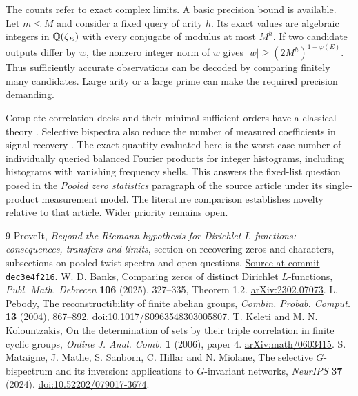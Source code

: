 \documentclass[11pt]{article}
\begin{document}
The counts refer to exact complex limits. A basic precision bound is available. Let $m\le M$ and consider a fixed query of arity $h$. Its exact values are algebraic integers in $\mathbb Q(\zeta_E)$ with every conjugate of modulus at most $M^h$. If two candidate outputs differ by $w$, the nonzero integer norm of $w$ gives $|w|\ge(2M^h)^{1-\varphi(E)}$. Thus sufficiently accurate observations can be decoded by comparing finitely many candidates. Large arity or a large prime can make the required precision demanding.

Complete correlation decks and their minimal sufficient orders have a classical theory \cite{pebody,kk}. Selective bispectra also reduce the number of measured coefficients in signal recovery \cite{selective}. The exact quantity evaluated here is the worst-case number of individually queried balanced Fourier products for integer histograms, including histograms with vanishing frequency shells. This answers the fixed-list question posed in the \emph{Pooled zero statistics} paragraph of the source article under its single-product measurement model. The literature comparison establishes novelty relative to that article. Wider priority remains open.

\begin{thebibliography}{9}\small
{} ProveIt, \emph{Beyond the Riemann hypothesis for Dirichlet $L$-functions: consequences, transfers and limits}, section on recovering zeros and characters, subsections on pooled twist spectra and open questions. \href{https://github.com/VladimirReshetnikov/ProveIt/blob/dec3e4f216305071186a1cc4c42fe1cdb38df9be/Analysis/GeneralizedRiemannHypothesis/Article/sections/rec.tex}{Source at commit \texttt{dec3e4f216}}.
 W. D. Banks, Comparing zeros of distinct Dirichlet $L$-functions, \emph{Publ. Math. Debrecen} \textbf{106} (2025), 327--335, Theorem 1.2. \href{https://arxiv.org/abs/2302.07073}{arXiv:2302.07073}.
 L. Pebody, The reconstructibility of finite abelian groups, \emph{Combin. Probab. Comput.} \textbf{13} (2004), 867--892. \href{https://doi.org/10.1017/S0963548303005807}{doi:10.1017/S0963548303005807}.
 T. Keleti and M. N. Kolountzakis, On the determination of sets by their triple correlation in finite cyclic groups, \emph{Online J. Anal. Comb.} \textbf{1} (2006), paper 4. \href{https://arxiv.org/abs/math/0603415}{arXiv:math/0603415}.
 S. Mataigne, J. Mathe, S. Sanborn, C. Hillar and N. Miolane, The selective $G$-bispectrum and its inversion: applications to $G$-invariant networks, \emph{NeurIPS} \textbf{37} (2024). \href{https://doi.org/10.52202/079017-3674}{doi:10.52202/079017-3674}.
\end{thebibliography}
\end{document}
